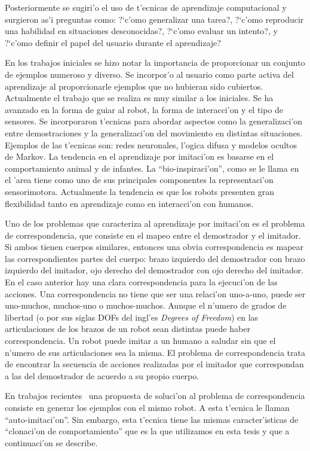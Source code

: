 \documentclass[11pt]{article}
\begin{document}
Posteriormente se sugiri'o el uso de t'ecnicas de aprendizaje computacional y surgieron as'i preguntas como: ?`c'omo generalizar una tarea?, ?`c'omo reproducir una habilidad en situaciones desconocidas?, ?`c'omo evaluar un intento?, y ?`c'omo definir el papel del usuario durante el aprendizaje?

En los trabajos iniciales se hizo notar la importancia de proporcionar un conjunto de ejemplos numeroso y diverso. Se incorpor'o al usuario como parte activa del aprendizaje al proporcionarle ejemplos que no hubieran sido cubiertos. Actualmente el trabajo que se realiza es muy similar a los iniciales. Se ha avanzado en la forma de guiar al robot, la forma de interacci'on y el tipo de sensores. Se incorporaron t'ecnicas para abordar aspectos como la generalizaci'on entre demostraciones y la generalizaci'on del movimiento en distintas situaciones. Ejemplos de las t'ecnicas son: redes neuronales, l'ogica difusa y modelos ocultos de Markov. La tendencia en el \textsf{aprendizaje por imitaci'on} es basarse en el comportamiento animal y de infantes. La ``bio-inspiraci'on'', como se le llama en el 'area tiene como uno de sus principales componentes la representaci'on sensorimotora. Actualmente la tendencia es que los robots presenten gran flexibilidad tanto en aprendizaje como en interacci'on con humanos. 

Uno de los problemas que caracteriza al \textsf{aprendizaje por imitaci'on} es el problema de correspondencia, que consiste en el mapeo entre el demostrador y el imitador. Si ambos tienen cuerpos similares, entonces una obvia correspondencia es mapear las correspondientes partes del cuerpo: brazo izquierdo del demostrador con brazo izquierdo del imitador, ojo derecho del demostrador con ojo derecho del imitador. En el caso anterior hay una clara correspondencia para la ejecuci'on de las acciones. Una correspondencia no tiene que ser una relaci'on uno-a-uno, puede ser uno-muchos, muchos-uno o muchos-muchos. Aunque el n'umero de grados de libertad (o por sus siglas DOFs del ingl'es \textit{Degrees of Freedom}) en las articulaciones de los brazos de un robot sean distintas puede haber correspondencia. Un robot puede imitar a un humano a saludar sin que el n'umero de sus articulaciones sea la misma. El problema de correspondencia trata de encontrar la secuencia de acciones realizadas por el imitador que correspondan a las del demostrador de acuerdo a su propio cuerpo.

En trabajos recientes~\cite{saunders:self} una propuesta de soluci'on al problema de correspondencia consiste en generar los ejemplos con el mismo robot. A esta t'ecnica le llaman ``auto-imitaci'on''. Sin embargo, esta t'ecnica tiene las mismas caracter'isticas de ``clonaci'on de comportamiento'' que es la que utilizamos en esta tesis y que a continuaci'on se describe.
\end{document}
